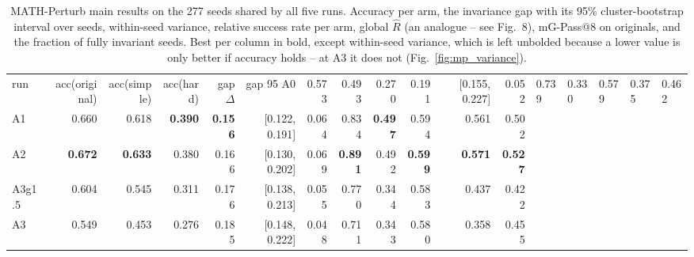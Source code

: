 \begin{table}[t]
\centering
\small
\begin{tabular}{lrrrrrrrrrrr}
\toprule
run & acc(original) & acc(simple) & acc(hard) & gap $\Delta$ & gap 95%
\midrule
A0 & 0.573 & 0.493 & 0.270 & 0.191 & [0.155, 0.227] & 0.052 & 0.739 & 0.330 & 0.579 & 0.375 & 0.462 \\
A1 & 0.660 & 0.618 & \textbf{0.390} & \textbf{0.156} & [0.122, 0.191] & 0.064 & 0.834 & \textbf{0.497} & 0.594 & 0.561 & 0.502 \\
A2 & \textbf{0.672} & \textbf{0.633} & 0.380 & 0.166 & [0.130, 0.202] & 0.069 & \textbf{0.891} & 0.492 & \textbf{0.599} & \textbf{0.571} & \textbf{0.527} \\
A3g1.5 & 0.604 & 0.545 & 0.311 & 0.176 & [0.138, 0.213] & 0.055 & 0.770 & 0.344 & 0.583 & 0.437 & 0.422 \\
A3 & 0.549 & 0.453 & 0.276 & 0.185 & [0.148, 0.222] & 0.048 & 0.711 & 0.343 & 0.580 & 0.358 & 0.455 \\
\bottomrule
\end{tabular}
\caption{MATH-Perturb main results on the 277 seeds shared by all five runs. Accuracy per arm, the invariance gap with its 95\% cluster-bootstrap interval over seeds, within-seed variance, relative success rate per arm, global $\hat{R}$ (an analogue -- see Fig.~8), mG-Pass@8 on originals, and the fraction of fully invariant seeds. Best per column in bold, except within-seed variance, which is left unbolded because a lower value is only better if accuracy holds -- at A3 it does not (Fig.~\ref{fig:mp_variance}).}
\label{tab:mp_main}
\end{table}
